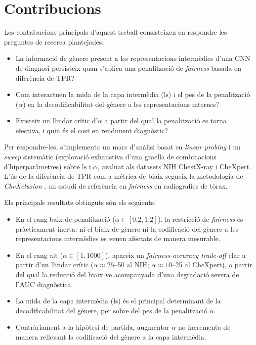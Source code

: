 \documentclass[a4paper,12pt,twoside]{ThesisStyle}
\begin{document}
\section{Contribucions}

Les contribucions principals d'aquest treball consisteixen en respondre les preguntes de recerca plantejades:

\begin{itemize}
    \item La informació de gènere present a les representacions intermèdies d'una CNN de diagnosi persisteix quan s'aplica una penalització de \textit{fairness} basada en diferència de TPR?
    \item Com interactuen la mida de la capa intermèdia ($\text{ls}$) i el pes de la penalització ($\alpha$) en la decodificabilitat del gènere a les representacions internes?
    \item Existeix un llindar crític d'$\alpha$ a partir del qual la penalització es torna efectiva, i quin és el cost en rendiment diagnòstic?
\end{itemize}

Per respondre-les, s'implementa un marc d'anàlisi basat en \textit{linear probing} i un \textit{sweep} sistemàtic (exploració exhaustiva d'una graella de combinacions d'hiperparàmetres) sobre $\text{ls}$ i $\alpha$, avaluat als datasets NIH ChestX-ray i CheXpert. L'ús de la diferència de TPR com a mètrica de biaix segueix la metodologia de \textit{CheXclusion} \cite{SeyyedKalantari2021}, un estudi de referència en \textit{fairness} en radiografies de tòrax.

Els principals resultats obtinguts són els següents:
\begin{itemize}
    \item En el rang baix de penalització ($\alpha \in [0.2, 1.2]$), la restricció de \textit{fairness} és pràcticament inerta: ni el biaix de gènere ni la codificació del gènere a les representacions intermèdies es veuen afectats de manera mesurable.
    \item En el rang alt ($\alpha \in [1, 1000]$), apareix un \textit{fairness-accuracy trade-off} clar a partir d'un llindar crític ($\alpha \approx 25$--50 al NIH; $\alpha \approx 10$--25 al CheXpert), a partir del qual la reducció del biaix ve acompanyada d'una degradació severa de l'AUC diagnòstica.
    \item La mida de la capa intermèdia ($\text{ls}$) és el principal determinant de la decodificabilitat del gènere, per sobre del pes de la penalització $\alpha$.
    \item Contràriament a la hipòtesi de partida, augmentar $\alpha$ no incrementa de manera rellevant la codificació del gènere a la capa intermèdia.
\end{itemize}
\end{document}
